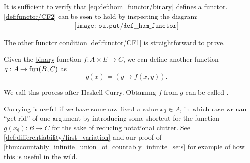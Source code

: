 \begin{defproof}
  It is sufficient to verify that \eqref{eq:def:hom_functor/binary} defines a functor. \ref{def:functor/CF2} can be seen to hold by inspecting the diagram:
  \begin{equation}\label{eq:def:hom_functor/inv_composition}
    \begin{aligned}
      \texttt{[image: output/def\_\_hom\_functor]}
    \end{aligned}
  \end{equation}

  The other functor condition \ref{def:functor/CF1} is straightforward to prove.
\end{defproof}

\begin{definition}\label{def:function_currying}
  Given the \hyperref[con:function_arguments]{binary} function \( f: A \times B \to C \), we can define another function \( g: A \to \operatorname{fun}(B, C) \) as
  \begin{equation*}
    g(x) \coloneqq (y \mapsto f(x, y)).
  \end{equation*}

  We call this process  after Haskell Curry. Obtaining \( f \) from \( g \) can be called .
\end{definition}
\begin{comments}
  \item Currying is useful if we have somehow fixed a value \( x_0 \in A \), in which case we can \enquote{get rid} of one argument by introducing some shortcut for the function \( g(x_0): B \to C \) for the sake of reducing notational clutter. See \cref{def:differentiability/first_variation} and our proof of \cref{thm:countably_infinite_union_of_countably_infinite_sets} for example of how this is useful in the wild.
\end{comments}

